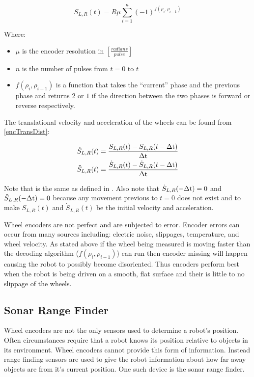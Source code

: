 \documentclass[main.tex]{subfiles}
\begin{document}
\begin{equation}
\label{eq:encTransDist}
S_{L,R}(t) = R\mu\sum_{i=1}^n{(-1)^{f(\rho_i,\rho_{i-1})}}
\end{equation}

Where: 
\begin{itemize}
\item $\mu$ is the encoder resolution in $[\frac{radians}{pulse}]$
\item $n$ is the number of pulses from $t=0$ to $t$
\item $f(\rho_i,\rho_{i-1})$ is a function that takes the ``current'' phase and
the previous phase and returns $2$ or $1$ if the direction between the two
phases is forward or reverse respectively.
\end{itemize}

The translational velocity and acceleration of the wheels can be found from \eqref{encTransDist}:

\begin{eqnarray}
\label{eq:encTransSpeed}
\dot{S}_{L,R}(t) = \frac{S_{L,R}(t)-S_{L,R}(t-\Delta\mathrm{t})}{\Delta\mathrm{t}}
\\
\ddot{S}_{L,R}(t) = \frac{\dot{S}_{L,R}(t)-\dot{S}_{L,R}(t-\Delta\mathrm{t})}{\Delta\mathrm{t}}
\end{eqnarray}

Note that \delt is the same as defined in . Also note that
$\dot{S}_{L,R}(-\Delta\mathrm{t}) = 0$ and $\ddot{S}_{L,R}(-\Delta\mathrm{t}) = 0$ because any
movement previous to $t=0$ does not exist and to make $S_{L,R}(t)$ and
$\dot{S}_{L,R}(t)$ be the initial velocity and acceleration.

Wheel encoders are not perfect and are subjected to error. Encoder errors can
occur from many sources including: electric noise, slippages, temperature, and
wheel velocity. As stated above if the wheel being measured is moving faster
than the decoding algorithm ($f(\rho_i,\rho_{i-1})$) can run then encoder
missing will happen causing the robot to possibly become disoriented. Thus
encoders perform best when the robot is being driven on a smooth, flat surface
and their is little to no slippage of the wheels. 

\subsection{Sonar Range Finder}
Wheel encoders are not the only sensors used to determine a robot's position.
Often circumstances require that a robot knows its position relative to objects
in its environment. Wheel encoders cannot provide this form of information.
Instead range finding sensors are used to give the robot information about how
far away objects are from it's current position. One such device is the sonar
range finder. 
\end{document}
